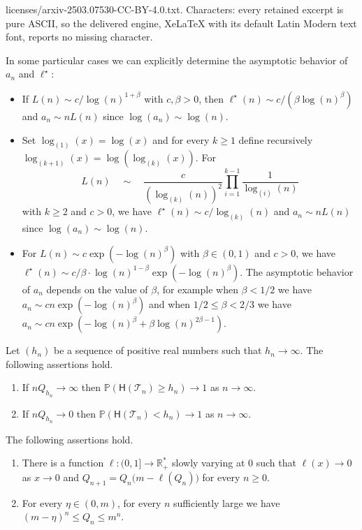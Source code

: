 \documentclass[10pt,a4paper]{amsart}
\DeclareRobustCommand{\P}{\mathbb{P}}
\DeclareRobustCommand{\R}{\mathbb{R}}
\begin{document}
licenses/arxiv-2503.07530-CC-BY-4.0.txt. Characters: every retained excerpt is pure ASCII, so the delivered engine, XeLaTeX with its default Latin Modern text font, reports no missing character.
\begin{example}
\label{ex:anl}
In some particular cases we can explicitly determine the asymptotic behavior of $a_n$ and $\ell^\star$: 
\begin{itemize}
\item[(i)] If $L(n)\sim c  / \log(n)^{1+\beta}$ with $c,\beta>0$, then $\ell^\star(n) \sim c/(\beta \log(n)^{\beta})$ and $a_n \sim   n L(n)$ since $\log(a_n) \sim \log(n)$.
\item[(ii)] Set $\log_{(1)}(x)=\log(x)$ and for every $k \geq 1$ define recursively $\log_{(k+1)} (x) = \log(\log_{(k)}(x))$. For
 \[
 L(n) \quad \sim \quad  \frac{c}{(\log_{(k)}(n))^{2}} \prod_{i=1}^{k-1} \frac{1}{\log_{(i)}(n) } \]
 with $k \geq 2$ and $c>0$, we have $\ell^\star(n) \sim c/\log_{(k)}(n)$ and $a_n \sim   n L(n)$  since $\log(a_n) \sim \log(n)$. 
\item[(iii)]   For $L(n) \sim  c   \exp(-\log(n)^{\beta}) $ with $\beta \in (0,1)$ and $c>0$, we have $\ell^\star(n) \sim   c/\beta \cdot \log(n)^{1-\beta} \exp(-\log(n)^{\beta})$. The asymptotic behavior of $a_n$ depends on the value of $\beta$, for example when $\beta<1/2$ we have $a_n \sim c   n\exp(-\log(n)^{\beta}) $ and when $1/2 \leq \beta <2/3$ we have $a_n \sim c   n \exp(-\log(n)^{\beta} + \beta \log(n)^{2 \beta-1})$.
\end{itemize}
\end{example}

\begin{proposition}
\label{prop:height}
Let $(h_{n})$ be a sequence of positive real numbers such that $h_{n} \rightarrow \infty$. The following assertions hold.
\begin{enumerate}
\item[(i)] If $n Q_{ h_{n}} \rightarrow \infty$ then $\P(\mathsf{H}(\mathcal{T}_n) \geq  h_{n}) \rightarrow 1$ as $n \rightarrow \infty$.
\item[(ii)] If $n Q_{ h_{n}} \rightarrow 0$ then $\P(\mathsf{H}(\mathcal{T}_n) < h_{n}) \rightarrow 1$ as $n \rightarrow \infty$.
\end{enumerate}
\end{proposition}

\begin{lemma}
\label{lem:bounds} The following assertions hold.
\begin{enumerate}
\item[(i)] There is a   function $\ell : (0,1] \rightarrow \R_{+}^{*}$ slowly varying at $0$ such that $\ell(x) \rightarrow 0$ as $x \rightarrow 0$ and $Q_{n+1} = Q_n\big(m-\ell(Q_n)\big)$ for every  $n \geq 0$.
\item[(ii)] For every $\eta \in (0,m)$, for every $n$ sufficiently large  we have $(m-\eta)^{n} \leq Q_{n} \leq m^{n}.$
\end{enumerate}
\end{lemma} 
\end{document}
